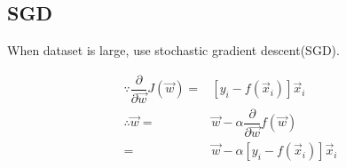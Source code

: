 \subsection{SGD}
When dataset is large, use stochastic gradient descent(SGD).

\begin{align}
\because \dfrac{\partial}{\partial \vec{w}}J(\vec{w})=& \left[y_i - f(\vec{x}_i) \right]\vec{x}_i \\
\therefore \vec{w}=& \vec{w} - \alpha\dfrac{\partial}{\partial \vec{w}}f(\vec{w}) \nonumber \\
                  =& \vec{w} - \alpha\left[y_i - f(\vec{x}_i) \right]\vec{x}_i
\end{align}
